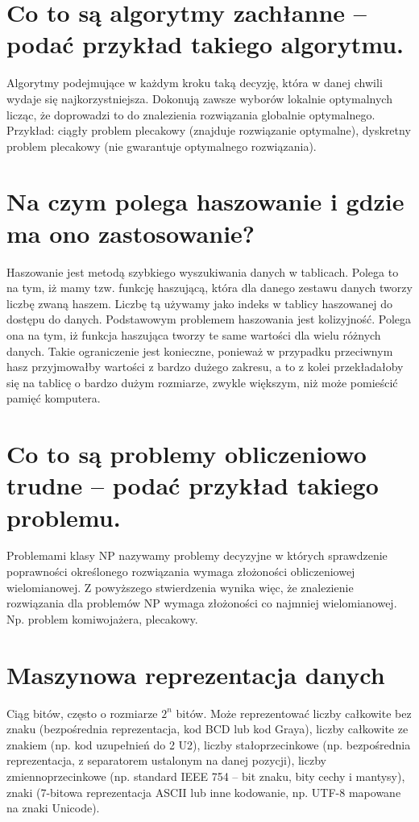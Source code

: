 \documentclass[12pt,a4paper]{article}
\begin{document}
	\section{Co to są algorytmy zachłanne – podać przykład takiego algorytmu.}
	Algorytmy podejmujące w każdym kroku taką decyzję, która w danej chwili wydaje się najkorzystniejsza. Dokonują zawsze wyborów lokalnie optymalnych licząc, że doprowadzi to do znalezienia rozwiązania globalnie optymalnego. Przykład: ciągły problem plecakowy (znajduje rozwiązanie optymalne), dyskretny problem plecakowy (nie gwarantuje optymalnego rozwiązania).

	\section{Na czym polega haszowanie i gdzie ma ono zastosowanie?}
	Haszowanie jest metodą szybkiego wyszukiwania danych w tablicach. Polega to na tym, iż mamy tzw. funkcję haszującą, która dla danego zestawu danych tworzy liczbę zwaną haszem. Liczbę tą używamy jako indeks w tablicy haszowanej do dostępu do danych. Podstawowym problemem haszowania jest kolizyjność. Polega ona na tym, iż funkcja haszująca tworzy te same wartości dla wielu różnych danych. Takie ograniczenie jest konieczne, ponieważ w przypadku przeciwnym hasz przyjmowałby wartości z bardzo dużego zakresu, a to z kolei przekładałoby się na tablicę o bardzo dużym rozmiarze, zwykle większym, niż może pomieścić pamięć komputera.

	\section{Co to są problemy obliczeniowo trudne – podać przykład takiego problemu.}
	Problemami klasy NP nazywamy problemy decyzyjne w których sprawdzenie poprawności określonego rozwiązania wymaga złożoności obliczeniowej wielomianowej. Z powyższego stwierdzenia wynika więc, że znalezienie rozwiązania dla problemów NP wymaga złożoności co najmniej wielomianowej. Np. problem komiwojażera, plecakowy.

	\section{Maszynowa reprezentacja danych}
	Ciąg bitów, często o rozmiarze $2^n$ bitów. Może reprezentować liczby całkowite bez znaku (bezpośrednia reprezentacja, kod BCD lub kod Graya), liczby całkowite ze znakiem (np. kod uzupełnień do 2 U2), liczby stałoprzecinkowe (np. bezpośrednia reprezentacja, z separatorem ustalonym na danej pozycji), liczby zmiennoprzecinkowe (np. standard IEEE 754 -- bit znaku, bity cechy i mantysy), znaki (7-bitowa reprezentacja ASCII lub inne kodowanie, np. UTF-8 mapowane na znaki Unicode).
\end{document}
